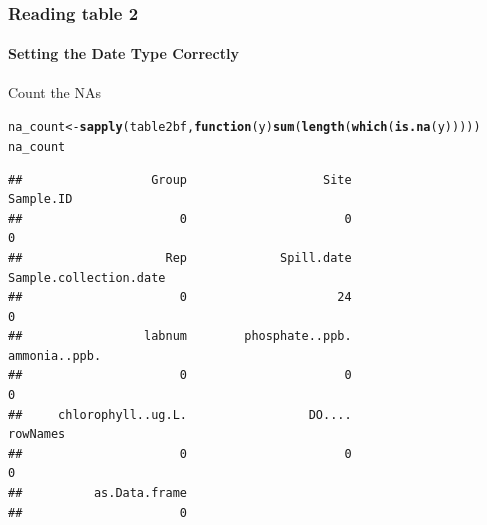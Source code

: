 \documentclass[12pt]{beamer}\usepackage[]{graphicx}\usepackage[]{color}
\makeatletter
\newcommand{\hlstd}[1]{\textcolor[rgb]{0.345,0.345,0.345}{#1}}%
\newcommand{\hlkwa}[1]{\textcolor[rgb]{0.161,0.373,0.58}{\textbf{#1}}}%
\newcommand{\hlkwb}[1]{\textcolor[rgb]{0.69,0.353,0.396}{#1}}%
\newcommand{\hlkwc}[1]{\textcolor[rgb]{0.333,0.667,0.333}{#1}}%
\newcommand{\hlkwd}[1]{\textcolor[rgb]{0.737,0.353,0.396}{\textbf{#1}}}%
\newenvironment{kframe}{%
 \def\at@end@of@kframe{}%
 \ifinner\ifhmode%
  \def\at@end@of@kframe{\end{minipage}}%
  \begin{minipage}{\columnwidth}%
 \fi\fi%
 \def\FrameCommand##1{\hskip\@totalleftmargin \hskip-\fboxsep
 \colorbox{shadecolor}{##1}\hskip-\fboxsep
     \hskip-\linewidth \hskip-\@totalleftmargin \hskip\columnwidth}%
 \MakeFramed {\advance\hsize-\width
   \@totalleftmargin\z@ \linewidth\hsize
   \@setminipage}}%
 {\par\unskip\endMakeFramed%
 \at@end@of@kframe}
\newenvironment{knitrout}{}{} %
\makeatother
\begin{document}
\begin{frame}[fragile]
  \frametitle{Reading table 2}
  \framesubtitle{Setting the Date Type Correctly}
\begin{block}{Count the NAs}
\end{block}
\begin{knitrout}
\color{fgcolor}\begin{kframe}
\begin{alltt}
\hlstd{na_count} \hlkwb{<-}\hlkwd{sapply}\hlstd{(table2bf,} \hlkwa{function}\hlstd{(}\hlkwc{y}\hlstd{)} \hlkwd{sum}\hlstd{(}\hlkwd{length}\hlstd{(}\hlkwd{which}\hlstd{(}\hlkwd{is.na}\hlstd{(y)))))}
\hlstd{na_count}
\end{alltt}
\begin{verbatim}
##                  Group                   Site              Sample.ID 
##                      0                      0                      0 
##                    Rep             Spill.date Sample.collection.date 
##                      0                     24                      0 
##                 labnum        phosphate..ppb.          ammonia..ppb. 
##                      0                      0                      0 
##     chlorophyll..ug.L.                 DO....               rowNames 
##                      0                      0                      0 
##          as.Data.frame 
##                      0
\end{verbatim}
\end{kframe}
\end{knitrout}
\clearpage
\end{frame}

\end{document}
